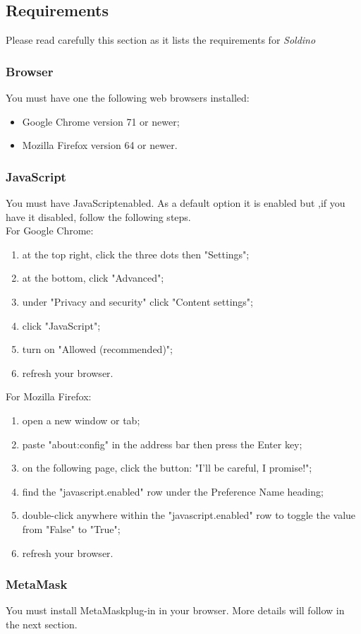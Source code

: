 	\subsection{Requirements}
	Please read carefully this section as it lists the requirements for 
	\textit{Soldino}
	 	\subsubsection{Browser}
		You must have one the following web browsers installed:
		\begin{itemize}
			\item Google Chrome version 71 or newer;
			\item Mozilla Firefox version 64 or newer.
		\end{itemize}
		\subsubsection{JavaScript}
		You must have JavaScript\glosp enabled. As a default option it is enabled but 
		,if you have it disabled, follow the following steps.\\
		For Google Chrome:
		\begin{enumerate}
			\item at the top right, click the three dots then "Settings";
			\item at the bottom, click "Advanced";
			\item under "Privacy and security" click "Content settings";
			\item click "JavaScript";
			\item turn on "Allowed (recommended)";
			\item refresh your browser.
		\end{enumerate}
		For Mozilla Firefox:
		\begin{enumerate}
			\item open a new window or tab;
			\item paste "about:config" in the address bar then press the Enter 
			key;
			\item on the following page, click the button: "I'll be careful, 
			I promise!";
			\item find the "javascript.enabled" row under the Preference Name 
			heading;
			\item double-click anywhere within the "javascript.enabled" row to 
			toggle the value from "False" to "True";
			\item refresh your browser.
		\end{enumerate}
		\subsubsection{MetaMask}
		You must install MetaMask\glosp plug-in in your browser. More 
		details will follow in the next section. 
